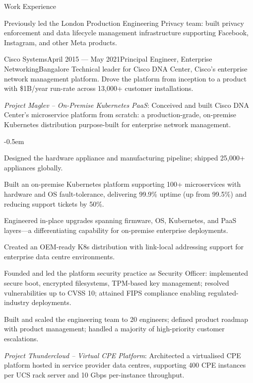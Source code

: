 \documentclass{resume} %
\begin{document}
\begin{rSection}{Work Experience}
\begin{rSubsection}{}{}{}{}{Previously led the London Production Engineering Privacy team: built privacy enforcement and data lifecycle management infrastructure supporting Facebook, Instagram, and other Meta products.}
\end{rSubsection}

\begin{rSubsection}{Cisco Systems}{April 2015 --- May 2021}{Principal Engineer, Enterprise Networking}{Bangalore}
{Technical leader for Cisco DNA Center, Cisco's enterprise network management platform. Drove the platform from inception to a product with \$1B/year run-rate across 13,000+ customer installations.}

\item {\em Project Maglev -- On-Premise Kubernetes PaaS}:
Conceived and built Cisco DNA Center's microservice platform from scratch: a production-grade, on-premise Kubernetes distribution purpose-built for enterprise network management.

\begin{itemize}
\renewcommand\labelitemi{--}
{\small
\itemsep -0.5em
\item Designed the hardware appliance and manufacturing pipeline; shipped 25,000+ appliances globally.
\item Built an on-premise Kubernetes platform supporting 100+ microservices with hardware and OS fault-tolerance, delivering 99.9\% uptime (up from 99.5\%) and reducing support tickets by 50\%.
\item Engineered in-place upgrades spanning firmware, OS, Kubernetes, and PaaS layers---a differentiating capability for on-premise enterprise deployments.
\item Created an OEM-ready K8s distribution with link-local addressing support for enterprise data centre environments.
\item Founded and led the platform security practice as Security Officer: implemented secure boot, encrypted filesystems, TPM-based key management; resolved vulnerabilities up to CVSS 10; attained FIPS compliance enabling regulated-industry deployments.
}
\end{itemize}

Built and scaled the engineering team to 20 engineers; defined product roadmap with product management; handled a majority of high-priority customer escalations.

\item {\em Project Thundercloud -- Virtual CPE Platform}:
Architected a virtualised CPE platform hosted in service provider data centres, supporting 400 CPE instances per UCS rack server and 10 Gbps per-instance throughput.

\end{rSubsection}


\end{rSection}
\end{document}
